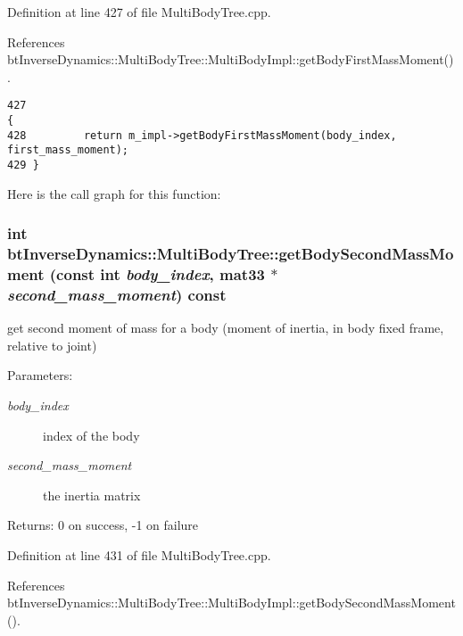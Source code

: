 Definition at line 427 of file MultiBodyTree.cpp.

References btInverseDynamics::MultiBodyTree::MultiBodyImpl::getBodyFirstMassMoment().

\begin{Code}\begin{verbatim}427                                                                                              {
428         return m_impl->getBodyFirstMassMoment(body_index, first_mass_moment);
429 }
\end{verbatim}
\end{Code}




Here is the call graph for this function:\hypertarget{classbt_inverse_dynamics_1_1_multi_body_tree_be2ffbd34157198fed40e005f7b154ee}{
\subsubsection[getBodySecondMassMoment]{\setlength{\rightskip}{0pt plus 5cm}int btInverseDynamics::MultiBodyTree::getBodySecondMassMoment (const int {\em body\_\-index}, \/  mat33 $\ast$ {\em second\_\-mass\_\-moment}) const}}
\label{classbt_inverse_dynamics_1_1_multi_body_tree_be2ffbd34157198fed40e005f7b154ee}


get second moment of mass for a body (moment of inertia, in body fixed frame, relative to joint) \begin{Desc}
\item[Parameters:]
\begin{description}
\item[{\em body\_\-index}]index of the body \item[{\em second\_\-mass\_\-moment}]the inertia matrix \end{description}
\end{Desc}
\begin{Desc}
\item[Returns:]0 on success, -1 on failure \end{Desc}


Definition at line 431 of file MultiBodyTree.cpp.

References btInverseDynamics::MultiBodyTree::MultiBodyImpl::getBodySecondMassMoment().

